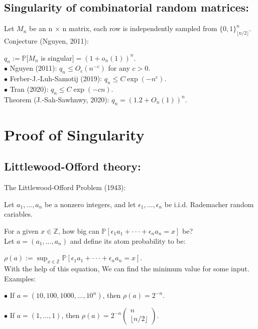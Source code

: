 \documentclass{article}
\begin{document}
\subsection{Singularity of combinatorial random matrices:}

Let ${M_n}$ be an n $\times$ n matrix, each row is independently sampled from $\{0, 1\}^n_{\lfloor n/2\rfloor}$.\\
Conjecture (Nguyen, 2011):

$q_n := \mathbb{P}[M_n$ is singular$] = (1 + o_n(1))^n $. \\
$\bullet$ {Nguyen (2011): $ q_n \leq O_c(n^{-c})$ for any $c > 0$}.\\
$\bullet$ {Ferber-J.-Luh-Samotij (2019): $ q_n \leq C \exp (-n^{c})$}.\\
$\bullet$ {Tran (2020): $ q_n \leq  C \exp (-cn)$}.\\
Theorem (J.-Sah-Sawhnwy, 2020): $q_n = (1.2 + O_n(1))^n$. \\

\section{Proof of Singularity}
\subsection{Littlewood-Offord theory:}
The Littlewood-Offord Problem (1943):

Let $a_1, ..., a_n$ be a nonzero integers, and let $\epsilon_1,...,\epsilon_n$ be i.i.d. Rademacher random cariables.

For a given $x \in \mathbb{Z}$, how big can $\mathbb{P}[\epsilon_1a_1+\cdot \cdot \cdot +\epsilon_na_n=x]$ be?\\
Let $a=(a_1, ..., a_n)$ and define its atom probability to be:

$\rho(a):= \sup_{x \in \mathbb{Z}}\mathbb{P}[\epsilon_1a_1+\cdot \cdot \cdot +\epsilon_na_n=x]$.\\
With the help of this equation, We can find the minimum value for some input.\\
Examples:

$\bullet$ {If $ a=(10,100,1000,...,10^n)$, then $\rho(a) = 2^{-n}$}.

$\bullet$ {If $ a=(1,...,1)$, then $\rho(a) = 2^{-n}\left( \begin{array}{c} n \\ {\lfloor n/2 \rfloor} \end{array} \right)$}.
\end{document}
